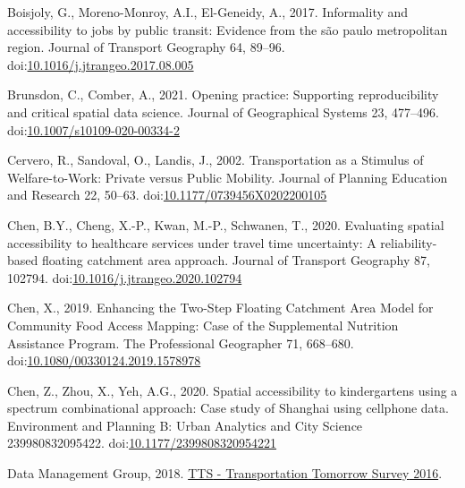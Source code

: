 \documentclass[]{elsarticle} %
\newlength{\cslhangindent}
\newlength{\cslentryspacingunit} %
\newenvironment{CSLReferences}[2] %
 {%
  \setlength{\parindent}{0pt}
  \ifodd #1
  \let\oldpar\par
  \def\par{\hangindent=\cslhangindent\oldpar}
  \fi
  \setlength{\parskip}{#2\cslentryspacingunit}
 }%
 {}
\begin{document}
\begin{CSLReferences}{1}{0}
\leavevmode{}%
Boisjoly, G., Moreno-Monroy, A.I., El-Geneidy, A., 2017. Informality and
accessibility to jobs by public transit: Evidence from the são paulo
metropolitan region. Journal of Transport Geography 64, 89--96.
doi:\href{https://doi.org/10.1016/j.jtrangeo.2017.08.005}{10.1016/j.jtrangeo.2017.08.005}

\leavevmode{}%
Brunsdon, C., Comber, A., 2021. Opening practice: Supporting
reproducibility and critical spatial data science. Journal of
Geographical Systems 23, 477--496.
doi:\href{https://doi.org/10.1007/s10109-020-00334-2}{10.1007/s10109-020-00334-2}

\leavevmode{}%
Cervero, R., Sandoval, O., Landis, J., 2002. Transportation as a
{Stimulus} of {Welfare}-to-{Work}: {Private} versus {Public} {Mobility}.
Journal of Planning Education and Research 22, 50--63.
doi:\href{https://doi.org/10.1177/0739456X0202200105}{10.1177/0739456X0202200105}

\leavevmode{}%
Chen, B.Y., Cheng, X.-P., Kwan, M.-P., Schwanen, T., 2020. Evaluating
spatial accessibility to healthcare services under travel time
uncertainty: {A} reliability-based floating catchment area approach.
Journal of Transport Geography 87, 102794.
doi:\href{https://doi.org/10.1016/j.jtrangeo.2020.102794}{10.1016/j.jtrangeo.2020.102794}

\leavevmode{}%
Chen, X., 2019. Enhancing the {Two}-{Step} {Floating} {Catchment} {Area}
{Model} for {Community} {Food} {Access} {Mapping}: {Case} of the
{Supplemental} {Nutrition} {Assistance} {Program}. The Professional
Geographer 71, 668--680.
doi:\href{https://doi.org/10.1080/00330124.2019.1578978}{10.1080/00330124.2019.1578978}

\leavevmode{}%
Chen, Z., Zhou, X., Yeh, A.G., 2020. Spatial accessibility to
kindergartens using a spectrum combinational approach: {Case} study of
{Shanghai} using cellphone data. Environment and Planning B: Urban
Analytics and City Science 239980832095422.
doi:\href{https://doi.org/10.1177/2399808320954221}{10.1177/2399808320954221}

\leavevmode{}%
Data Management Group, 2018.
\href{http://dmg.utoronto.ca/transportation-tomorrow-survey/tts-introduction}{{TTS}
- {Transportation} {Tomorrow} {Survey} 2016}.


\end{CSLReferences}
\end{document}
